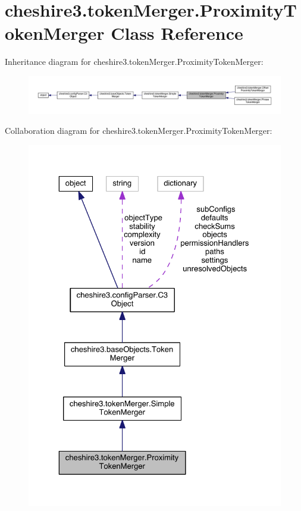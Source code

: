 \hypertarget{classcheshire3_1_1token_merger_1_1_proximity_token_merger}{\section{cheshire3.\-token\-Merger.\-Proximity\-Token\-Merger Class Reference}
\label{classcheshire3_1_1token_merger_1_1_proximity_token_merger}
}


Inheritance diagram for cheshire3.\-token\-Merger.\-Proximity\-Token\-Merger\-:
\nopagebreak
\begin{figure}[H]
\begin{center}
\leavevmode
\includegraphics[width=350pt]{classcheshire3_1_1token_merger_1_1_proximity_token_merger__inherit__graph}
\end{center}
\end{figure}


Collaboration diagram for cheshire3.\-token\-Merger.\-Proximity\-Token\-Merger\-:
\nopagebreak
\begin{figure}[H]
\begin{center}
\leavevmode
\includegraphics[width=325pt]{classcheshire3_1_1token_merger_1_1_proximity_token_merger__coll__graph}
\end{center}
\end{figure}
